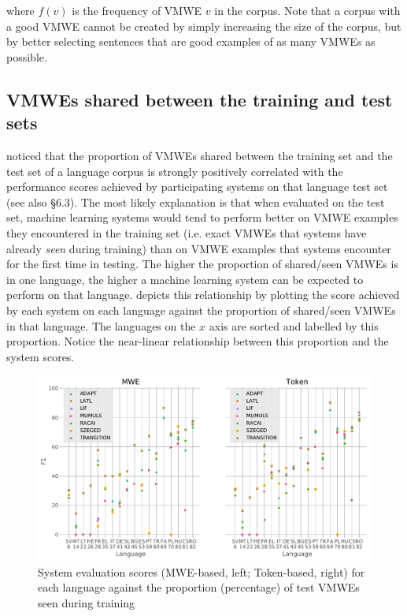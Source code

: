 \documentclass[output=paper,modfonts,nonflat,draftmode]{langsci/langscibook}
\begin{document}

where $f(v)$ is the frequency of VMWE $v$ in the corpus. Note that a corpus with a good VMWE  cannot be created by simply increasing the size of the corpus, but by better selecting sentences that are good examples of as many VMWEs as possible. 

\subsection{\label{sec:shared}VMWEs shared between the training and test sets}

\citet{maldonado2017} noticed that the proportion of VMWEs shared between the training set and the test set of a language corpus is strongly positively correlated with the performance scores achieved by participating systems on that language test set (see also  §6.3). The most likely explanation is that when evaluated on the test set, machine learning systems would tend to perform better on VMWE examples they encountered in the training set (i.e. exact VMWEs that systems have already \emph{seen} during training) than on VMWE examples that systems encounter for the first time in testing. The higher the proportion of shared/seen VMWEs is in one language, the higher a machine learning system can be expected to perform on that language.  depicts this relationship by plotting the score achieved by each system on each language against the proportion of shared/seen VMWEs in that language. The languages on the $x$ axis are sorted and labelled by this proportion. Notice the near-linear relationship between this proportion and the system scores.

\begin{figure}
\includegraphics[width=\textwidth]{figures/sys-f1-vs-ps-allvmwes.pdf}
\caption{\label{fig:f1-vs-ps-all}System evaluation scores (MWE-based, left; Token-based, right) for each language against the proportion (percentage) of test VMWEs seen during training}
\end{figure}
\end{document}
